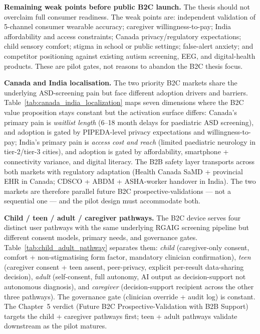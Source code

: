 

\noindent\textbf{Remaining weak points before public B2C launch.} The thesis should not overclaim full consumer readiness. The weak points are: independent validation of 5-channel consumer wearable accuracy; caregiver willingness-to-pay; India affordability and access constraints; Canada privacy/regulatory expectations; child sensory comfort; stigma in school or public settings; false-alert anxiety; and competitor positioning against existing autism screening, EEG, and digital-health products. These are pilot gates, not reasons to abandon the B2C thesis focus.

\noindent\textbf{Canada and India localisation.} The two priority B2C markets share the underlying ASD-screening pain but face different adoption drivers and barriers. Table~\ref{tab:canada_india_localization} maps seven dimensions where the B2C value proposition stays constant but the activation surface differs: Canada's primary pain is \emph{waitlist length} (6--18 month delays for paediatric ASD screening), and adoption is gated by PIPEDA-level privacy expectations and willingness-to-pay; India's primary pain is \emph{access cost and reach} (limited paediatric neurology in tier-2/tier-3 cities), and adoption is gated by affordability, smartphone + connectivity variance, and digital literacy. The B2B safety layer transports across both markets with regulatory adaptation (Health Canada SaMD + provincial EHR in Canada; CDSCO + ABDM + ASHA-worker handover in India). The two markets are therefore parallel future B2C prospective-validations --- not a sequential one --- and the pilot design must accommodate both.



\noindent\textbf{Child / teen / adult / caregiver pathways.} The B2C device serves four distinct user pathways with the same underlying RGAIG screening pipeline but different consent models, primary needs, and governance gates. Table~\ref{tab:child_adult_pathway} separates them: \emph{child} (caregiver-only consent, comfort + non-stigmatising form factor, mandatory clinician confirmation), \emph{teen} (caregiver consent + teen assent, peer-privacy, explicit per-result data-sharing decision), \emph{adult} (self-consent, full autonomy, AI output as decision-support not autonomous diagnosis), and \emph{caregiver} (decision-support recipient across the other three pathways). The governance gate (clinician override + audit log) is constant. The Chapter~5 verdict (Future B2C Prospective-Validation with B2B Support) targets the child + caregiver pathways first; teen + adult pathways validate downstream as the pilot matures.

